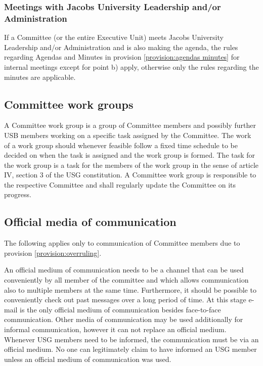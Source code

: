 \subsubsection{Meetings with Jacobs University Leadership and/or Administration}
  If a Committee (or the entire Executive Unit) meets Jacobs University Leadership and/or Administration and is also making the agenda, the rules regarding Agendas and Minutes in provision \ref{provision:agendas minutes} for internal meetings except for point b) apply, otherwise only the rules regarding the minutes are applicable. 

\subsection[Work groups]{Committee work groups}
A Committee work group is a group of Committee members and possibly further USB members working on a specific task assigned by the Committee. The work of a work group should whenever feasible follow a fixed time schedule to be decided on when the task is assigned and the work group is formed. The task for the work group is a task for the members of the work group in the sense of article IV, section 3 of the USG constitution. 
A Committee work group is responsible to the respective Committee and shall regularly update the Committee on its progress. %

\subsection{Official media of communication}
The following applies only to communication of Committee members due to provision \ref{provision:overruling}.

An official medium of communication needs to be a channel that can be used conveniently by all member of the committee and which allows communication also to multiple members at the same time. Furthermore, it should be possible to conveniently check out past messages over a long period of time. At this stage e-mail is the only official medium of communication besides face-to-face communication. 
Other media of communication may be used additionally for informal communication, however it can not replace an official medium. Whenever USG members need to be informed, the communication must be via an official medium. No one can legitimately claim to have informed an USG member unless an official medium of communication was used. 

